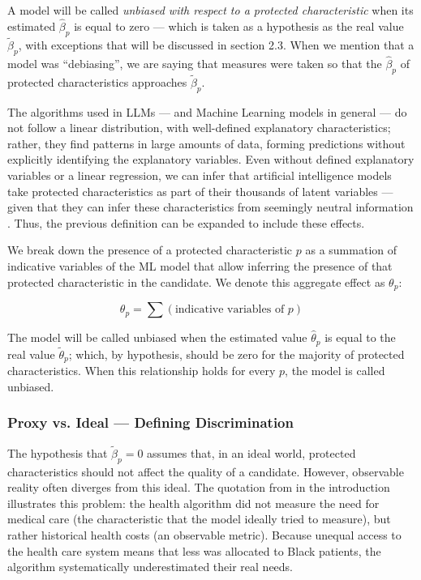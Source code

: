 \documentclass[12pt,a4paper]{article}
\begin{document}
A model will be called \textit{unbiased with respect to a protected characteristic}
when its estimated $\hat{\beta}_p$ is equal to zero --- which is taken
as a hypothesis as the real value $\tilde{\beta}_p$, with exceptions that will be discussed
in section 2.3. When we mention that a model was ``debiasing'',
we are saying that measures were taken so that the $\hat{\beta}_p$ of
protected characteristics approaches $\tilde{\beta}_p$.

The algorithms used in LLMs --- and Machine Learning models in
general --- do not follow a linear distribution, with well-defined
explanatory characteristics; rather, they find patterns in large
amounts of data, forming predictions without explicitly identifying
the explanatory variables. Even without defined explanatory variables or
a linear regression, we can infer that artificial intelligence models
take protected characteristics as part of their thousands
of latent variables --- given that they can infer these
characteristics from seemingly neutral information \citep{bai2024}. Thus, the previous definition can be expanded to include
these effects.

We break down the presence of a protected characteristic $p$ as a
summation of indicative variables of the ML model that allow inferring the
presence of that protected characteristic in the candidate. We denote this
aggregate effect as $\theta_p$:

\begin{equation}
\theta_p = \sum(\text{indicative variables of } p)
\end{equation}

The model will be called unbiased when the estimated value $\hat{\theta}_p$ is
equal to the real value $\tilde{\theta}_p$; which, by hypothesis, should be zero for the
majority of protected characteristics. When this relationship holds for
every $p$, the model is called unbiased.


\subsubsection{Proxy vs. Ideal --- Defining Discrimination}


The hypothesis that $\tilde{\beta}_p = 0$ assumes that, in an ideal world,
protected characteristics should not affect the quality of a
candidate. However, observable reality often diverges
from this ideal. The quotation from \citet{obermeyer2019} in the introduction illustrates
this problem: the health algorithm did not measure the need for medical
care (the characteristic that the model ideally tried to measure), but rather historical health
costs (an observable metric). Because unequal access to the health care system means that less was allocated to
Black patients, the algorithm systematically underestimated their
real needs.
\end{document}

